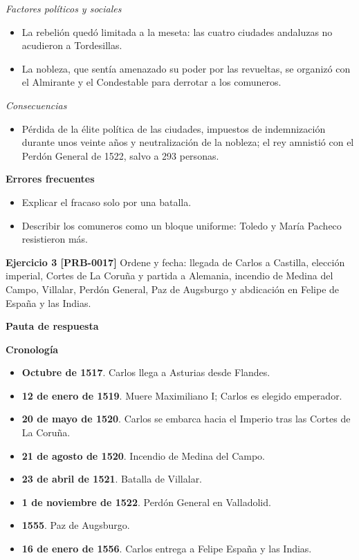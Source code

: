 \documentclass{book}
\begin{document}
\noindent\textit{Factores políticos y sociales}
\begin{itemize}
\item La rebelión quedó limitada a la meseta: las cuatro ciudades andaluzas no acudieron a Tordesillas.
\item La nobleza, que sentía amenazado su poder por las revueltas, se organizó con el Almirante y el Condestable para derrotar a los comuneros.
\end{itemize}

\noindent\textit{Consecuencias}
\begin{itemize}
\item Pérdida de la élite política de las ciudades, impuestos de indemnización durante unos veinte años y neutralización de la nobleza; el rey amnistió con el Perdón General de 1522, salvo a 293 personas.
\end{itemize}

\noindent\textbf{Errores frecuentes}
\begin{itemize}
\item Explicar el fracaso solo por una batalla.
\item Describir los comuneros como un bloque uniforme: Toledo y María Pacheco resistieron más.
\end{itemize}

\noindent\textbf{Ejercicio 3 [PRB-0017]}
Ordene y fecha: llegada de Carlos a Castilla, elección imperial, Cortes de La Coruña y partida a Alemania, incendio de Medina del Campo, Villalar, Perdón General, Paz de Augsburgo y abdicación en Felipe de España y las Indias.


\noindent\textbf{Pauta de respuesta}

\noindent\textbf{Cronología}
\begin{itemize}
\item \textbf{Octubre de 1517}. Carlos llega a Asturias desde Flandes.
\item \textbf{12 de enero de 1519}. Muere Maximiliano I; Carlos es elegido emperador.
\item \textbf{20 de mayo de 1520}. Carlos se embarca hacia el Imperio tras las Cortes de La Coruña.
\item \textbf{21 de agosto de 1520}. Incendio de Medina del Campo.
\item \textbf{23 de abril de 1521}. Batalla de Villalar.
\item \textbf{1 de noviembre de 1522}. Perdón General en Valladolid.
\item \textbf{1555}. Paz de Augsburgo.
\item \textbf{16 de enero de 1556}. Carlos entrega a Felipe España y las Indias.
\end{itemize}
\end{document}

